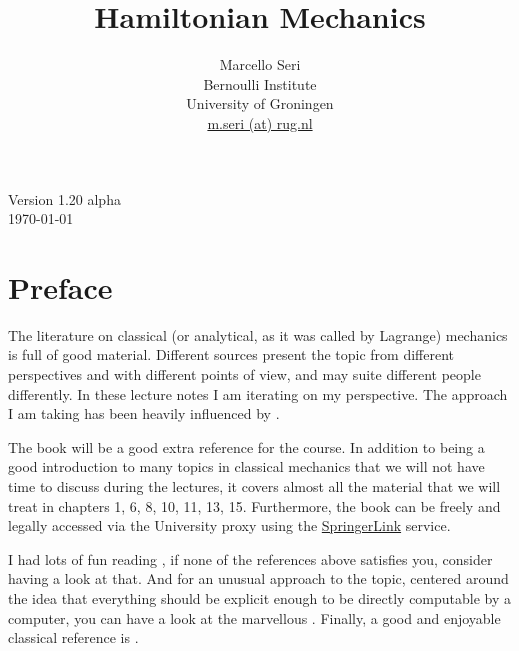 \documentclass[english,fontsize=11pt,paper=b5]{scrbook}
\title{Hamiltonian Mechanics}
\author{Marcello Seri\\
  \small{Bernoulli Institute}\vspace{-.2cm}\\
  \small{University of Groningen}\vspace{-.2cm}\\
  \small\href{mailto:m.seri@rug.nl}{m.seri (at) rug.nl}
}
\date{}
\numberwithin{equation}{chapter}
\theoremstyle{definition}
\begin{document}
\maketitle

\cleardoublepage

\thispagestyle{empty}
\null\vfill
\begin{center}
  Version 1.20 alpha\\
  \today
\end{center}
\begin{warpprint}
  \vfill
  \small{\doclicenseThis}
\end{warpprint}
\cleardoublepage

\tableofcontents

\cleardoublepage

\chapter*{Preface}

The literature on classical (or analytical, as it was called by Lagrange) mechanics is full of good material.
Different sources present the topic from different perspectives and with different points of view, and may suite different people differently.
In these lecture notes I am iterating on my perspective.
The approach I am taking has been heavily influenced by \cite{book:arnold, book:knauf, lectures:dubrovin, book:lowenstein, book:marsdenratiu, lectures:tong, landau1976mechanics}.

The book \cite{book:knauf} will be a good extra reference for the course. In addition to being a good introduction to many topics in classical mechanics that we will not have time to discuss during the lectures, it covers almost all the material that we will treat in chapters 1, 6, 8, 10, 11, 13, 15. Furthermore, the book can be freely and legally accessed via the University proxy using the \href{https://link.springer.com/book/10.1007%2F978-3-662-55774-7}{SpringerLink} service.

  I had lots of fun reading \cite{schwichtenberg2019no}, if none of the references above satisfies you, consider having a look at that. And for an unusual approach to the topic, centered around the idea that everything should be explicit enough to be directly computable by a computer, you can have a look at the marvellous \cite{book:sicm}. Finally, a good and enjoyable classical reference is \cite{goldstein2013classical}.\medskip
\end{document}
